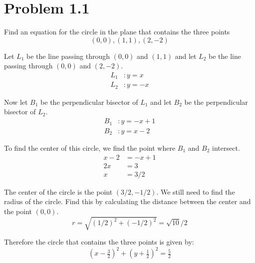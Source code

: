 \section*{Problem 1.1}

Find an equation for the circle in the plane that contains the three points
\[ (0, 0), (1, 1), (2,-2) \]

Let $L_1$ be the line passing through $(0,0)$ and $(1,1)$ and let $L_2$ be the
line passing through $(0,0)$ and $(2,-2)$.
\begin{align*}
  L_1&: y = x \\
  L_2&: y = -x
\end{align*}

Now let $B_1$ be the perpendicular bisector of $L_1$ and let $B_2$ be the
perpendicular bisector of $L_2$.
\begin{align*}
  B_1&: y = -x + 1 \\
  B_2&: y = x - 2
\end{align*}

To find the center of this circle, we find the point where $B_1$ and $B_2$
intersect.
\begin{align*}
  x - 2 &= -x + 1 \\
  2x &= 3 \\
  x &= 3/2
\end{align*}

The center of the circle is the point $(3/2, -1/2)$. We still need to find the 
radius of the circle. Find this by calculating the distance between the center
and the point $(0,0)$.
\[ r = \sqrt{(1/2)^2 + (-1/2)^2} = \sqrt{10}/2\]

Therefore the circle that contains the three points is given by:
\[ (x- \tfrac{3}{2})^2 + (y + \tfrac{1}{2})^2 = \tfrac{5}{2} \]
